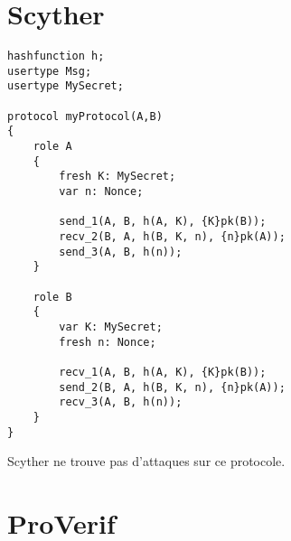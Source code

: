 \documentclass[10pt,a4paper]{article}
\begin{document}






\newpage

\section{Scyther}

\begin{Verbatim}[fontsize=\scriptsize]
hashfunction h;
usertype Msg;
usertype MySecret;

protocol myProtocol(A,B)
{
	role A
	{
		fresh K: MySecret;
		var n: Nonce;

		send_1(A, B, h(A, K), {K}pk(B));
		recv_2(B, A, h(B, K, n), {n}pk(A));
		send_3(A, B, h(n));
	}	
	
	role B
	{
		var K: MySecret;
		fresh n: Nonce;

		recv_1(A, B, h(A, K), {K}pk(B));
		send_2(B, A, h(B, K, n), {n}pk(A));
		recv_3(A, B, h(n));
	}
}
\end{Verbatim}

Scyther ne trouve pas d'attaques sur ce protocole.


\section{ProVerif}
\end{document}
